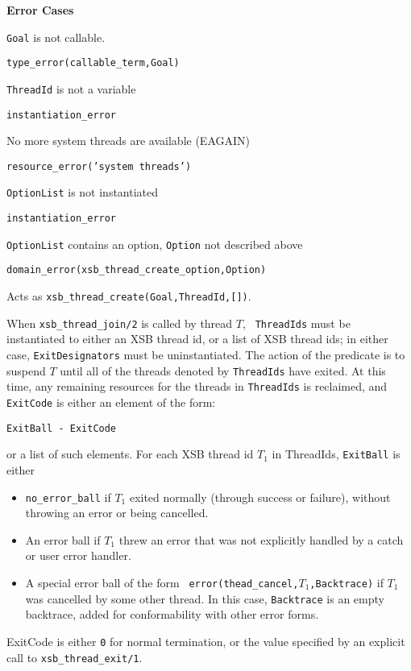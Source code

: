 \begin{description}
{\bf Error Cases}
\bi
\item 	{\tt Goal} is not callable.
\bi
\item 	{\tt type\_error(callable\_term,Goal)}
\ei
\item 	{\tt ThreadId} is not a variable
\bi
\item 	{\tt instantiation\_error}
\ei
\item   No more system threads are available (EAGAIN)
\bi
\item {\tt resource\_error('system threads')}
\ei
\item 	{\tt OptionList} is not instantiated
\bi
\item 	{\tt instantiation\_error}
\ei
\item 	{\tt OptionList} contains an option, {\tt Option} not described above
\bi
\item 	{\tt domain\_error(xsb\_thread\_create\_option,Option)}
\ei
\ei

%
Acts as {\tt xsb\_thread\_create(Goal,ThreadId,[])}.

% 
When {\tt xsb\_thread\_join/2} is called by thread $T$, {\tt
  ThreadIds} must be instantiated to either an XSB thread id, or a
list of XSB thread ids; in either case, {\tt ExitDesignators} must be
uninstantiated.  The action of the predicate is to suspend $T$ until
all of the threads denoted by {\tt ThreadIds} have exited.  At this
time, any remaining resources for the threads in {\tt ThreadIds} is
reclaimed, and {\tt ExitCode} is either an element of the form:
\begin{center}
{\tt ExitBall -  ExitCode} 
\end{center}
%
or a list of such elements.  For each XSB thread id $T_1$ in
{ThreadIds}, {\tt ExitBall} is either
\begin{itemize}
%
\item {\tt no\_error\_ball} if $T_1$ exited normally (through success or
  failure), without throwing an error or being cancelled.
%
\item An error ball if $T_1$ threw an error that was not explicitly
  handled by a catch or user error handler.
%
\item A special error ball of the form {\tt
  error(thead\_cancel,$T_1$,Backtrace)} if $T_1$ was cancelled by some
  other thread.  In this case, {\tt Backtrace} is an empty backtrace,
  added for conformability with other error forms.
\end{itemize}
%
ExitCode is either {\tt 0} for normal termination, or the value
specified by an explicit call to {\tt xsb\_thread\_exit/1}.


\end{description}
